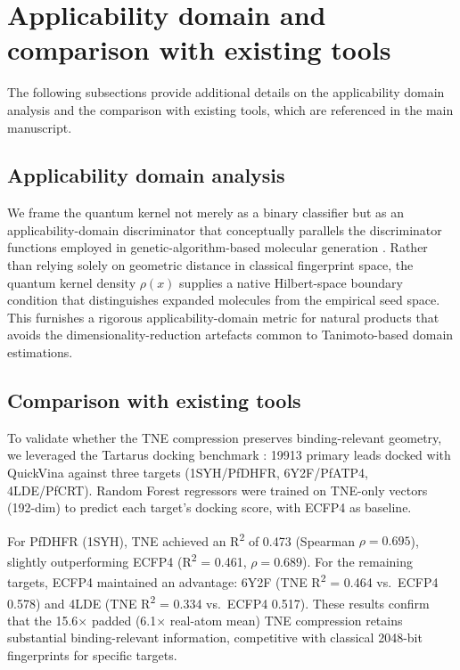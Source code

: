 \documentclass[11pt,a4paper]{article}
\begin{document}

\section{Applicability domain and comparison with existing tools}
\label{sec:applicability_comparison}

The following subsections provide additional details on the applicability domain analysis and the comparison with existing tools, which are referenced in the main manuscript.

\subsection{Applicability domain analysis}
\label{SM-sec:applicability_domain}

We frame the quantum kernel not merely as a binary classifier but as an applicability-domain discriminator that conceptually parallels the discriminator functions employed in genetic-algorithm-based molecular generation \citep{jensen2019augmenting}. Rather than relying solely on geometric distance in classical fingerprint space, the quantum kernel density $\rho(x)$ supplies a native Hilbert-space boundary condition that distinguishes expanded molecules from the empirical seed space. This furnishes a rigorous applicability-domain metric for natural products that avoids the dimensionality-reduction artefacts common to Tanimoto-based domain estimations.


\subsection{Comparison with existing tools}


To validate whether the TNE compression preserves binding-relevant geometry, we leveraged the Tartarus docking benchmark \citep{tartarus_2024}: \num{19913} primary leads docked with QuickVina against three targets (1SYH/PfDHFR, 6Y2F/PfATP4, 4LDE/PfCRT). Random Forest regressors were trained on TNE-only vectors (\num{192}-dim) to predict each target's docking score, with ECFP4 as baseline.

For PfDHFR (1SYH), TNE achieved an R\textsuperscript{2} of \num{0.473} (Spearman $\rho = \num{0.695}$), slightly outperforming ECFP4 (R\textsuperscript{2} = \num{0.461}, $\rho = \num{0.689}$). For the remaining targets, ECFP4 maintained an advantage: 6Y2F (TNE R\textsuperscript{2} = \num{0.464} vs.\ ECFP4 \num{0.578}) and 4LDE (TNE R\textsuperscript{2} = \num{0.334} vs.\ ECFP4 \num{0.517}). These results confirm that the \num{15.6}$\times$ padded (\num{6.1}$\times$ real-atom mean) TNE compression retains substantial binding-relevant information, competitive with classical \num{2048}-bit fingerprints for specific targets.
\end{document}
